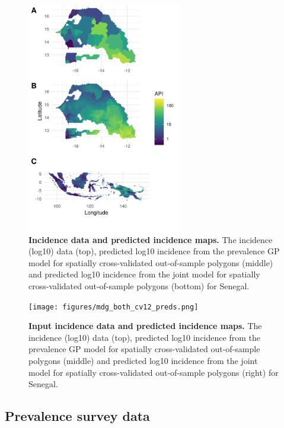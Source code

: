 \documentclass[10pt,letterpaper]{article}
\begin{document}
\begin{figure}
\includegraphics[width = 0.6\textwidth]{figures/sen_both_cv12_preds.png}
\caption{{\bf Incidence data and predicted incidence maps. } 
The incidence (log10) data (top), predicted log10 incidence from the prevalence GP model for spatially cross-validated out-of-sample polygons (middle) and predicted log10 incidence from the joint model for spatially cross-validated out-of-sample polygons (bottom) for Senegal.
}
\label{predobsmapsen}
\end{figure}



\begin{figure}
\texttt{[image: figures/mdg\_both\_cv12\_preds.png]}
\caption{{\bf Input incidence data and predicted incidence maps. } 
The incidence (log10) data (top), predicted log10 incidence from the prevalence GP model for spatially cross-validated out-of-sample polygons (middle) and predicted log10 incidence from the joint model for spatially cross-validated out-of-sample polygons (right) for Senegal.
}
\label{predobsmapmdg}
\end{figure}



\subsection*{Prevalence survey data}
\end{document}
